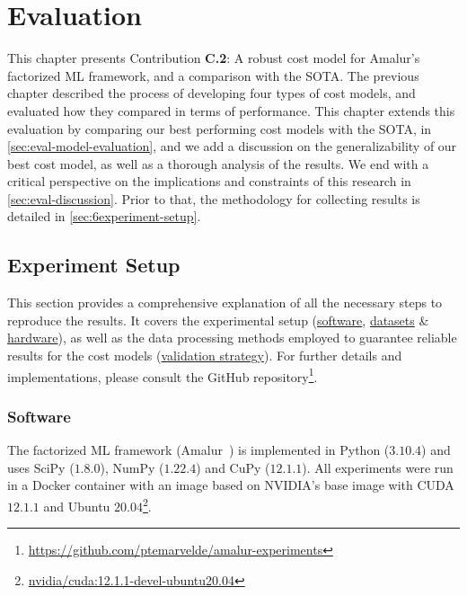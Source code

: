 
\chapter{Evaluation}
\label{chapter:evaluation-discussion}
This chapter presents Contribution \textbf{C.2}: A robust cost model for Amalur's factorized ML framework, and a comparison with the SOTA.
The previous chapter described the process of developing four types of cost models, and evaluated how they compared in terms of performance. This chapter extends this evaluation by comparing our best performing cost models with the SOTA, in \autoref{sec:eval-model-evaluation}, and we add a discussion on the generalizability of our best cost model, as well as a thorough analysis of the results. We end with a critical perspective on the implications and constraints of this research in \autoref{sec:eval-discussion}. Prior to that, the methodology for collecting results is detailed in \autoref{sec:6experiment-setup}.

\section{Experiment Setup}
\label{sec:6experiment-setup}
This section provides a comprehensive explanation of all the necessary steps to reproduce the results. It covers the experimental setup (\hyperref[subsec:6-software]{software}, \hyperref[subsec:6-datasets]{datasets} \& \hyperref[subsec:6-hardware]{hardware}), as well as the data processing methods employed to guarantee reliable results for the cost models (\hyperref[subsec:6-validation-strategy]{validation strategy}). For further details and implementations, please consult the GitHub repository\footnote{\url{https://github.com/ptemarvelde/amalur-experiments}}.

\subsection{Software}
\label{subsec:6-software}
The factorized ML framework (Amalur~\cite{amalur}) is implemented in Python ($3.10.4$) and uses SciPy ($1.8.0$), NumPy ($1.22.4$) and CuPy ($12.1.1$). All experiments were run in a Docker container with an image based on NVIDIA's base image with CUDA $12.1.1$ and Ubuntu $20.04$\footnote{\href{https://hub.docker.com/layers/nvidia/cuda/12.1.1-devel-ubuntu20.04/images/sha256-5bd13c67a4479a1c13238b470d89a92937ce68ba5f21b930d50c463e3314f657?context=explore}{nvidia/cuda:12.1.1-devel-ubuntu20.04}}.

